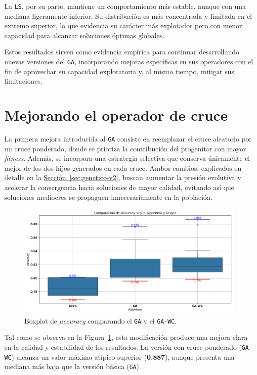 La \texttt{LS}, por su parte, mantiene un comportamiento más estable, aunque con una mediana ligeramente inferior.
Su distribución es más concentrada y limitada en el extremo superior, lo que evidencia su carácter más explotador pero con menor capacidad para alcanzar soluciones óptimas globales.

Estos resultados sirven como evidencia empírica para continuar desarrollando nuevas versiones del \texttt{GA},
incorporando mejoras específicas en sus operadores con el fin de aprovechar su capacidad exploratoria y, al mismo tiempo, mitigar sus limitaciones.

\section{Mejorando el operador de cruce}\label{sec:incorporacion-cruce}
La primera mejora introducida al \texttt{GA} consiste en reemplazar el cruce aleatorio por un cruce ponderado,
donde se prioriza la contribución del progenitor con mayor \textit{fitness}.
Además, se incorpora una estrategia selectiva que conserva únicamente el mejor de los dos hijos generados en cada cruce.
Ambos cambios, explicados en detalle en la \hyperref[sec:genetico-v2]{Sección~\ref*{sec:genetico-v2}},
buscan aumentar la presión evolutiva y acelerar la convergencia hacia soluciones de mayor calidad,
evitando así que soluciones mediocres se propaguen innecesariamente en la población.

\begin{figure}[htp]
    \centering
    \includegraphics[width=1\textwidth]{imagenes/evaluaciones/operador-de-cruce.png}
    \caption{Boxplot de \textit{accuracy} comparando el \texttt{GA} y el \texttt{GA-WC}.}
    \label{fig:cruce_ponderado}
\end{figure}

Tal como se observa en la Figura~\ref{fig:cruce_ponderado}, esta modificación produce una mejora clara en la calidad y estabilidad de los resultados.
La versión con cruce ponderado (\texttt{GA-WC}) alcanza un valor máximo atípico superior (\textbf{0.887}),
aunque presenta una mediana más baja que la versión básica (\texttt{GA}).

